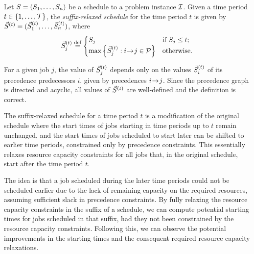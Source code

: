 \begin{defn} \label{def:suffix-relaxed-schedule}
    Let $S = (S_{1}, \dots, S_{n})$ be a schedule to a problem instance $\mathcal{I}$.
    Given a time period $t \in \{{1}, \dots, {\mathcal{T}}\}$,
    the \emph{suffix-relaxed schedule} for the time period $t$ is given by
    $\vec{S}^{(t)} = (\vec{S}^{(t)}_{1}, \dots, \vec{S}^{(t)}_{n})$, where
    $$
    \vec{S}^{(t)}_{j} \overset{\text{def}}{=} \begin{cases}
        S_{j} & \text{if $S_{j} \leq t$;} \\
        \max\left\{\vec{S}^{(t)}_{j} : i \hspace{-0.2em} \rightarrow \hspace{-0.2em} j \in \mathcal{P} \right\} & \text{otherwise.}
    \end{cases}
    $$
\end{defn}

For a given job $j$, the value of $\vec{S}^{(t)}_{j}$
depends only on the values $\vec{S}^{(t)}_{i}$ of its precedence predecessors $i$,
given by precedences $i \hspace{-0.2em} \rightarrow \hspace{-0.2em} j$.
Since the precedence graph is directed and acyclic,
all values of $\vec{S}^{(t)}$ are well-defined and the definition is correct.

The suffix-relaxed schedule for a time period $t$ is a modification of the original schedule
where the start times of jobs starting in time periods up to $t$ remain unchanged,
and the start times of jobs scheduled to start later can be shifted to earlier time periods,
constrained only by precedence constraints.
This essentially relaxes resource capacity constraints for all jobs that, in the original schedule,
start after the time period $t$.

The idea is that a job scheduled during the later time periods could not be scheduled earlier
due to the lack of remaining capacity on the required resources,
assuming sufficient slack in precedence constraints.
By fully relaxing the resource capacity constraints in the suffix of a schedule,
we can compute potential starting times for jobs scheduled in that suffix,
had they not been constrained by the resource capacity constraints.
Following this, we can observe the potential improvements in the starting times
and the consequent required resource capacity relaxations.

